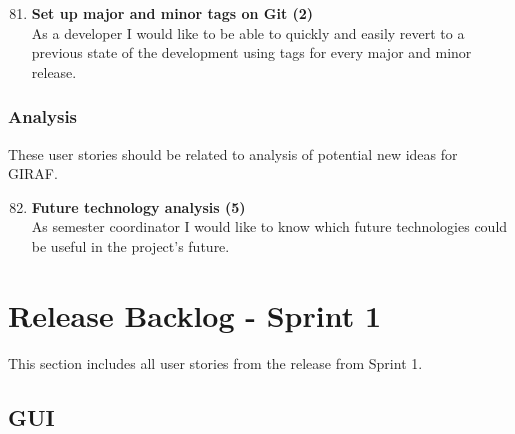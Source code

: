 \begin{enumerate}
	\setcounter{enumi}{80} %
	\item \textbf{Set up major and minor tags on Git (2)}\\
	As a developer I would like to be able to quickly and easily revert to a previous state of the development using tags for every major and minor release.
\end{enumerate}

\subsubsection{Analysis}
These user stories should be related to analysis of potential new ideas for GIRAF.

\begin{enumerate}
	\setcounter{enumi}{81} %
	\item \textbf{Future technology analysis (5)}\\
	As semester coordinator I would like to know which future technologies could be useful in the project’s future.
\end{enumerate}

\section{Release Backlog - Sprint 1}
This section includes all user stories from the release from Sprint 1.

\subsection{GUI}

